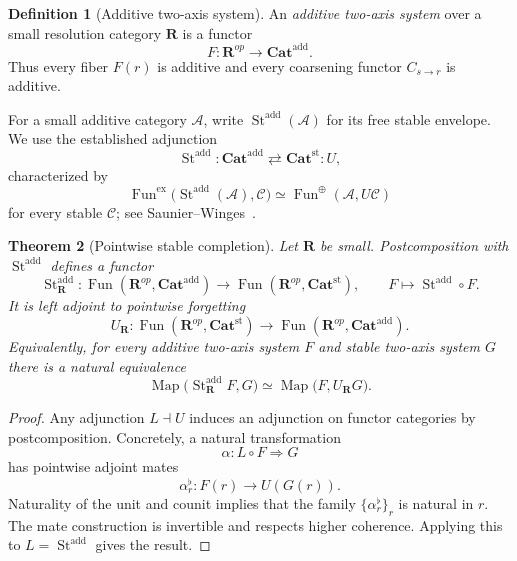 \documentclass[11pt]{article}
\newtheorem{theorem}{Theorem}[section]
\theoremstyle{definition}
\newtheorem{definition}[theorem]{Definition}
\theoremstyle{remark}
\newcommand{\Rcat}{\mathbf R}
\begin{document}
\begin{definition}[Additive two-axis system]
An \emph{additive two-axis system} over a small resolution category $\Rcat$ is a functor
\[
F:\Rcat^{op}\longrightarrow \mathbf{Cat}^{\mathrm{add}}.
\]
Thus every fiber $F(r)$ is additive and every coarsening functor $C_{s\to r}$ is additive.
\end{definition}

For a small additive category $\mathcal A$, write $\operatorname{St}^{\mathrm{add}}(\mathcal A)$ for its free stable envelope. We use the established adjunction
\[
\operatorname{St}^{\mathrm{add}}:
\mathbf{Cat}^{\mathrm{add}}
\rightleftarrows
\mathbf{Cat}^{\mathrm{st}}:U,
\]
characterized by
\[
\operatorname{Fun}^{\mathrm{ex}}
\bigl(\operatorname{St}^{\mathrm{add}}(\mathcal A),\mathcal C\bigr)
\simeq
\operatorname{Fun}^{\oplus}(\mathcal A,U\mathcal C)
\]
for every stable $\mathcal C$; see Saunier--Winges~\cite{SaunierWinges2026}.

\begin{theorem}[Pointwise stable completion]\label{thm:pointwise-stable}
Let $\Rcat$ be small. Postcomposition with $\operatorname{St}^{\mathrm{add}}$ defines a functor
\[
\operatorname{St}^{\mathrm{add}}_{\Rcat}:
\operatorname{Fun}(\Rcat^{op},\mathbf{Cat}^{\mathrm{add}})
\longrightarrow
\operatorname{Fun}(\Rcat^{op},\mathbf{Cat}^{\mathrm{st}}),
\qquad
F\longmapsto \operatorname{St}^{\mathrm{add}}\circ F.
\]
It is left adjoint to pointwise forgetting
\[
U_{\Rcat}:
\operatorname{Fun}(\Rcat^{op},\mathbf{Cat}^{\mathrm{st}})
\longrightarrow
\operatorname{Fun}(\Rcat^{op},\mathbf{Cat}^{\mathrm{add}}).
\]
Equivalently, for every additive two-axis system $F$ and stable two-axis system $G$ there is a natural equivalence
\[
\operatorname{Map}
\bigl(\operatorname{St}^{\mathrm{add}}_{\Rcat}F,G\bigr)
\simeq
\operatorname{Map}
\bigl(F,U_{\Rcat}G\bigr).
\]
\end{theorem}

\begin{proof}
Any adjunction $L\dashv U$ induces an adjunction on functor categories by postcomposition. Concretely, a natural transformation
\[
\alpha:L\circ F\Rightarrow G
\]
has pointwise adjoint mates
\[
\alpha_r^{\flat}:F(r)\longrightarrow U(G(r)).
\]
Naturality of the unit and counit implies that the family $\{\alpha_r^{\flat}\}_r$ is natural in $r$. The mate construction is invertible and respects higher coherence. Applying this to $L=\operatorname{St}^{\mathrm{add}}$ gives the result.
\end{proof}
\end{document}
